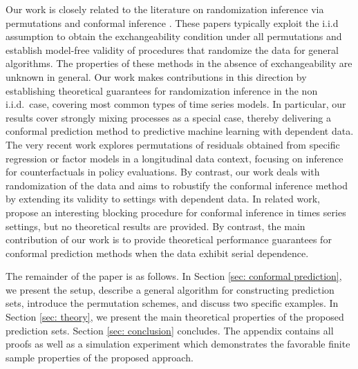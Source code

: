 \documentclass[final,12pt]{colt2018} %
\newcommand{\KW}[1]{\textcolor{cyan}{KW: #1}}
\begin{document}
Our work is closely related to the literature on randomization inference via permutations \citep{fisher1935design,rubin1984bayesianly,romano1990behavior,lehmann2005testing} and conformal inference \citep{vovk2005algorithmic,vovk2009online,lei2013distribution,vovk2013conditional,lei2014distribution,burnaev2014efficiency,balasubramanian2014conformal,lei2015conformal,lei2017distributionfree}. These papers typically exploit the i.i.d assumption to obtain the exchangeability condition under all permutations and establish model-free validity of procedures that randomize the data for general algorithms. 
The properties of these methods in the absence of exchangeability are unknown in general.  Our work makes contributions in this direction by establishing theoretical guarantees for randomization inference in the non i.i.d.\ case, covering most common types of time series models. In particular, our results cover strongly mixing processes as a special case, thereby delivering a conformal prediction method to predictive machine learning with dependent data.    The very recent work \citet{chernozhukov2017exact} explores permutations of residuals obtained from specific regression or factor models in a longitudinal data context, focusing on inference for counterfactuals in policy evaluations. By contrast, our work deals with randomization of the data and aims to robustify the conformal inference method by extending its validity to settings with dependent data. In related work, \cite{dashevskiy2008network,dashevskiy2011times} propose an interesting blocking procedure for conformal inference in times series settings, but no theoretical results are provided. By contrast, the main contribution of our work is to provide theoretical performance guarantees for conformal prediction methods when the data exhibit serial dependence.


 

The remainder of the paper is as follows. In Section \ref{sec: conformal prediction}, we present the setup, describe a general algorithm for constructing prediction sets, introduce the permutation schemes, and discuss two specific examples. In Section \ref{sec: theory}, we present the main theoretical properties of the proposed prediction sets. Section \ref{sec: conclusion} concludes. The appendix contains all proofs as well as a simulation experiment which demonstrates the favorable finite sample properties of the proposed approach.
\end{document}
